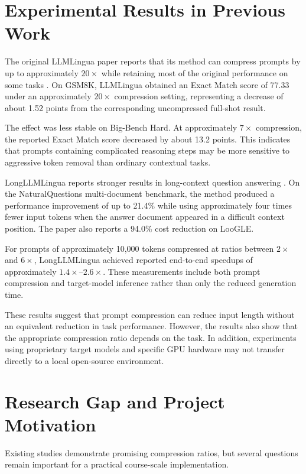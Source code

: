 \documentclass[10pt,a4paper,twocolumn]{article}
\begin{document}
\section{Experimental Results in Previous Work}

The original LLMLingua paper reports that its method can compress prompts by up to approximately $20\times$ while retaining most of the original performance on some tasks \citep{jiang-etal-2023-llmlingua}. On GSM8K, LLMLingua obtained an Exact Match score of 77.33 under an approximately $20\times$ compression setting, representing a decrease of about 1.52 points from the corresponding uncompressed full-shot result.

The effect was less stable on Big-Bench Hard. At approximately $7\times$ compression, the reported Exact Match score decreased by about 13.2 points. This indicates that prompts containing complicated reasoning steps may be more sensitive to aggressive token removal than ordinary contextual tasks.

LongLLMLingua reports stronger results in long-context question answering \citep{jiang-etal-2024-longllmlingua}. On the NaturalQuestions multi-document benchmark, the method produced a performance improvement of up to 21.4\% while using approximately four times fewer input tokens when the answer document appeared in a difficult context position. The paper also reports a 94.0\% cost reduction on LooGLE.

For prompts of approximately 10,000 tokens compressed at ratios between $2\times$ and $6\times$, LongLLMLingua achieved reported end-to-end speedups of approximately $1.4\times$--$2.6\times$. These measurements include both prompt compression and target-model inference rather than only the reduced generation time.

These results suggest that prompt compression can reduce input length without an equivalent reduction in task performance. However, the results also show that the appropriate compression ratio depends on the task. In addition, experiments using proprietary target models and specific GPU hardware may not transfer directly to a local open-source environment.

\section{Research Gap and Project Motivation}

Existing studies demonstrate promising compression ratios, but several questions remain important for a practical course-scale implementation.
\end{document}
